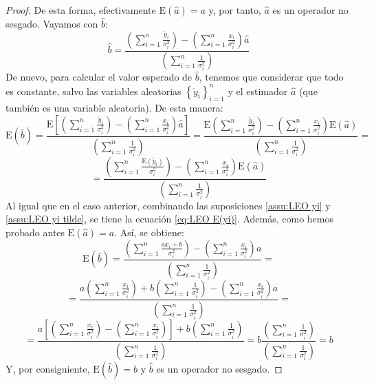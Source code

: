 \documentclass[11pt,a4paper,spanish]{article}
\numberwithin{equation}{section}
\numberwithin{table}{section}
\numberwithin{figure}{section}
\theoremstyle{definition}
\theoremstyle{remark}
\theoremstyle{definition}
\theoremstyle{remark}
\theoremstyle{plain}
\theoremstyle{plain}
\theoremstyle{plain}
\theoremstyle{plain}
\theoremstyle{plain}
\theoremstyle{plain}
\begin{document}
\begin{proof}
		De esta forma, efectivamente $\mathrm{E}\left(\hat{a}\right)=a$ y,
		por tanto, $\hat{a}$ es un operador no sesgado. Vayamos con $\hat{b}$:
		\[
		\hat{b}=\frac{\left(\sum_{i=1}^{n}\frac{\mathring{y}_{i}}{\sigma_{i}^{2}}\right)-\left(\sum_{i=1}^{n}\frac{x_{i}}{\sigma_{i}^{2}}\right)\hat{a}}{\left(\sum_{i=1}^{n}\frac{1}{\sigma_{i}^{2}}\right)}
		\]
		De nuevo, para calcular el valor esperado de $\hat{b}$, tenemos que
		considerar que todo es constante, salvo las variables aleatorias $\left\{ \mathring{y}_{i}\right\} _{i=1}^{n}$
		y el estimador $\hat{a}$ (que también es una variable aleatoria).
		De esta manera:
		\[
		\mathrm{E}\left(\hat{b}\right)=\frac{\mathrm{E}\left[\left(\sum_{i=1}^{n}\frac{\mathring{y}_{i}}{\sigma_{i}^{2}}\right)-\left(\sum_{i=1}^{n}\frac{x_{i}}{\sigma_{i}^{2}}\right)\hat{a}\right]}{\left(\sum_{i=1}^{n}\frac{1}{\sigma_{i}^{2}}\right)}=\frac{\mathrm{E}\left(\sum_{i=1}^{n}\frac{\mathring{y}_{i}}{\sigma_{i}^{2}}\right)-\left(\sum_{i=1}^{n}\frac{x_{i}}{\sigma_{i}^{2}}\right)\mathrm{E}\left(\hat{a}\right)}{\left(\sum_{i=1}^{n}\frac{1}{\sigma_{i}^{2}}\right)}=
		\]
		\[
		=\frac{\left(\sum_{i=1}^{n}\frac{\mathrm{E}\left(\mathring{y}_{i}\right)}{\sigma_{i}^{2}}\right)-\left(\sum_{i=1}^{n}\frac{x_{i}}{\sigma_{i}^{2}}\right)\mathrm{E}\left(\hat{a}\right)}{\left(\sum_{i=1}^{n}\frac{1}{\sigma_{i}^{2}}\right)}
		\]
		Al igual que en el caso anterior, combinando las suposiciones \vref{assu:LEO yi}
		y \vref{assu:LEO yi tilde}, se tiene la ecuación \vref{eq:LEO E(yi)}.
		Además, como hemos probado antes $\mathrm{E}\left(\hat{a}\right)=a$.
		Así, se obtiene:
		\[
		\mathrm{E}\left(\hat{b}\right)=\frac{\left(\sum_{i=1}^{n}\frac{ax_{i}+b}{\sigma_{i}^{2}}\right)-\left(\sum_{i=1}^{n}\frac{x_{i}}{\sigma_{i}^{2}}\right)a}{\left(\sum_{i=1}^{n}\frac{1}{\sigma_{i}^{2}}\right)}=
		\]
		\[
		=\frac{a\left(\sum_{i=1}^{n}\frac{x_{i}}{\sigma_{i}^{2}}\right)+b\left(\sum_{i=1}^{n}\frac{1}{\sigma_{i}^{2}}\right)-\left(\sum_{i=1}^{n}\frac{x_{i}}{\sigma_{i}^{2}}\right)a}{\left(\sum_{i=1}^{n}\frac{1}{\sigma_{i}^{2}}\right)}=
		\]
		\[
		=\frac{a\left[\left(\sum_{i=1}^{n}\frac{x_{i}}{\sigma_{i}^{2}}\right)-\left(\sum_{i=1}^{n}\frac{x_{i}}{\sigma_{i}^{2}}\right)\right]+b\left(\sum_{i=1}^{n}\frac{1}{\sigma_{i}^{2}}\right)}{\left(\sum_{i=1}^{n}\frac{1}{\sigma_{i}^{2}}\right)}=b\frac{\left(\sum_{i=1}^{n}\frac{1}{\sigma_{i}^{2}}\right)}{\left(\sum_{i=1}^{n}\frac{1}{\sigma_{i}^{2}}\right)}=b
		\]
		Y, por consiguiente, $\mathrm{E}\left(\hat{b}\right)=b$ y $\hat{b}$
		es un operador no sesgado.
	\end{proof}
\end{document}
